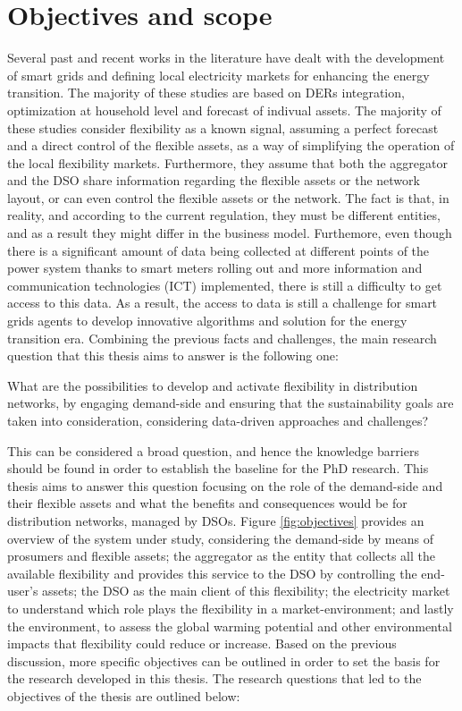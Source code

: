 \newpage 
\section{Objectives and scope}\label{sec:objectives}
Several past and recent works in the literature have dealt with the development of smart grids and defining local electricity markets for enhancing the energy transition. The majority of these studies are based on DERs integration, optimization at household level and forecast of indivual assets. The majority of these studies consider flexibility as a known signal, assuming a perfect forecast and a direct control of the flexible assets, as a way of simplifying the operation of the local flexibility markets. Furthermore, they assume that both the aggregator and the DSO share information regarding the flexible assets or the network layout, or can even control the flexible assets or the network. The fact is that, in reality, and according to the current regulation, they must be different entities, and as a result they might differ in the business model. Furthemore, even though there is a significant amount of data being collected at different points of the power system thanks to smart meters rolling out and more information and communication technologies (ICT) implemented, there is still a difficulty to get access to this data. As a result, the access to data is still a challenge for smart grids agents to develop innovative algorithms and solution for the energy transition era. Combining the previous facts and challenges, the main research question that this thesis aims to answer is the following one:

\vspace*{1mm}
\begin{tcolorbox}
What are the possibilities to develop and activate flexibility in distribution networks, by engaging demand-side and ensuring that the sustainability goals are taken into consideration, considering data-driven approaches and challenges? 
\end{tcolorbox}

This can be considered a broad question, and hence the knowledge barriers should be found in order to establish the baseline for the PhD research. This thesis aims to answer this question focusing on the role of the demand-side and their flexible assets and what the benefits and consequences would be for distribution networks, managed by DSOs. Figure \ref{fig:objectives} provides an overview of the system under study, considering the demand-side by means of prosumers and flexible assets; the aggregator as the entity that collects all the available flexibility and provides this service to the DSO by controlling the end-user's assets; the DSO as the main client of this flexibility; the electricity market to understand which role plays the flexibility in a market-environment; and lastly the environment, to assess the global warming potential and other environmental impacts that flexibility could reduce or increase. Based on the previous discussion, more specific objectives can be outlined in order to set the basis for the research developed in this thesis. The research questions that led to the objectives of the thesis are outlined below: 
\vspace*{2mm}


